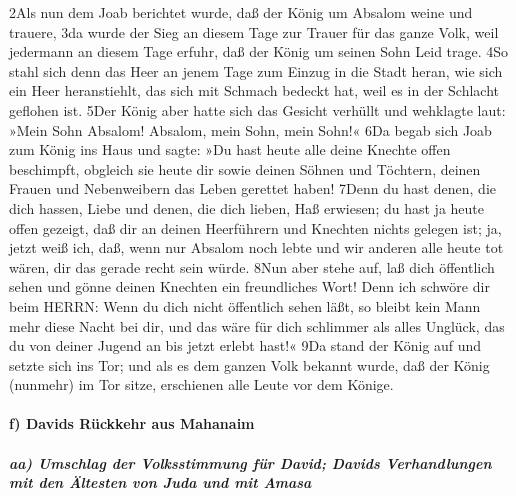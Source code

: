 2Als nun dem Joab berichtet wurde, daß der König um Absalom weine und
trauere, 3da wurde der Sieg an diesem Tage zur Trauer für das ganze
Volk, weil jedermann an diesem Tage erfuhr, daß der König um seinen Sohn
Leid trage. 4So stahl sich denn das Heer an jenem Tage zum Einzug in die
Stadt heran, wie sich ein Heer heranstiehlt, das sich mit Schmach
bedeckt hat, weil es in der Schlacht geflohen ist. 5Der König aber hatte
sich das Gesicht verhüllt und wehklagte laut: »Mein Sohn Absalom!
Absalom, mein Sohn, mein Sohn!« 6Da begab sich Joab zum König ins Haus
und sagte: »Du hast heute alle deine Knechte offen beschimpft, obgleich
sie heute dir sowie deinen Söhnen und Töchtern, deinen Frauen und
Nebenweibern das Leben gerettet haben! 7Denn du hast denen, die dich
hassen, Liebe und denen, die dich lieben, Haß erwiesen; du hast ja heute
offen gezeigt, daß dir an deinen Heerführern und Knechten nichts gelegen
ist; ja, jetzt weiß ich, daß, wenn nur Absalom noch lebte und wir
anderen alle heute tot wären, dir das gerade recht sein würde. 8Nun aber
stehe auf, laß dich öffentlich sehen und gönne deinen Knechten ein
freundliches Wort! Denn ich schwöre dir beim HERRN: Wenn du dich nicht
öffentlich sehen läßt, so bleibt kein Mann mehr diese Nacht bei dir, und
das wäre für dich schlimmer als alles Unglück, das du von deiner Jugend
an bis jetzt erlebt hast!« 9Da stand der König auf und setzte sich ins
Tor; und als es dem ganzen Volk bekannt wurde, daß der König (nunmehr)
im Tor sitze, erschienen alle Leute vor dem Könige.

\hypertarget{f-davids-ruxfcckkehr-aus-mahanaim}{%
\paragraph{f) Davids Rückkehr aus
Mahanaim}\label{f-davids-ruxfcckkehr-aus-mahanaim}}

\hypertarget{aa-umschlag-der-volksstimmung-fuxfcr-david-davids-verhandlungen-mit-den-uxe4ltesten-von-juda-und-mit-amasa}{%
\subparagraph{aa) Umschlag der Volksstimmung für David; Davids
Verhandlungen mit den Ältesten von Juda und mit
Amasa}\label{aa-umschlag-der-volksstimmung-fuxfcr-david-davids-verhandlungen-mit-den-uxe4ltesten-von-juda-und-mit-amasa}}

